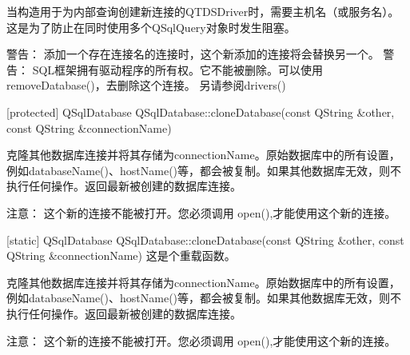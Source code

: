 
当构造用于为内部查询创建新连接的QTDSDriver时，需要主机名（或服务名）。这是为了防止在同时使用多个QSqlQuery对象时发生阻塞。

警告： 添加一个存在连接名的连接时，这个新添加的连接将会替换另一个。 警告： SQL框架拥有驱动程序的所有权。它不能被删除。可以使用removeDatabase()，去删除这个连接。 另请参阅drivers()

[protected] QSqlDatabase QSqlDatabase::cloneDatabase(const QString \&other, const QString \&connectionName)

克隆其他数据库连接并将其存储为connectionName。原始数据库中的所有设置，例如databaseName()、hostName()等，都会被复制。如果其他数据库无效，则不执行任何操作。返回最新被创建的数据库连接。

注意： 这个新的连接不能被打开。您必须调用 open(),才能使用这个新的连接。

[static] QSqlDatabase QSqlDatabase::cloneDatabase(const QString \&other, const QString \&connectionName)
这是个重载函数。

克隆其他数据库连接并将其存储为connectionName。原始数据库中的所有设置，例如databaseName()、hostName()等，都会被复制。如果其他数据库无效，则不执行任何操作。返回最新被创建的数据库连接。

注意： 这个新的连接不能被打开。您必须调用 open(),才能使用这个新的连接。

